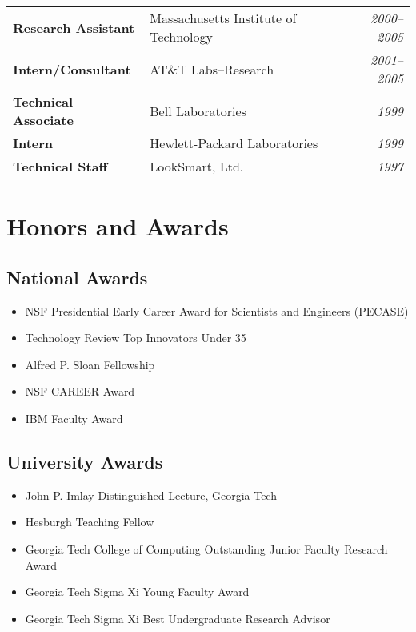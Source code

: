 \documentclass{article}
\begin{document}
\begin{cv}{}
\begin{center}
\begin{tabular}{p{2in}p{3in}r}
{\bf Research Assistant} & Massachusetts Institute of Technology & {\em
2000--2005} \\

{\bf Intern/Consultant} & AT\&T Labs--Research & {\em 2001--2005} \\
{\bf Technical Associate} & Bell Laboratories & {\em 1999} \\
{\bf Intern} & Hewlett-Packard Laboratories & {\em 1999} \\
{\bf Technical Staff} & LookSmart, Ltd. & {\em 1997} \\

\end{tabular}
\end{center}

\newpage
\section*{Honors and Awards}
\label{subsec:mylabel4}




\subsection*{National Awards}

\begin{itemize}
\itemsep=-1pt
\item NSF Presidential Early Career Award for Scientists and Engineers (PECASE) 
\item Technology Review Top Innovators Under 35
\item Alfred P. Sloan Fellowship
\item NSF CAREER Award
\item IBM Faculty Award
\end{itemize}

\subsection*{University Awards}
\begin{itemize}
\itemsep=-1pt
\item John P. Imlay Distinguished Lecture, Georgia Tech 
\item Hesburgh Teaching Fellow
\item Georgia Tech College of Computing Outstanding Junior Faculty Research Award
\item Georgia Tech Sigma Xi Young Faculty Award
\item Georgia Tech Sigma Xi Best Undergraduate Research Advisor
\end{itemize}



\end{cv}
\end{document}
